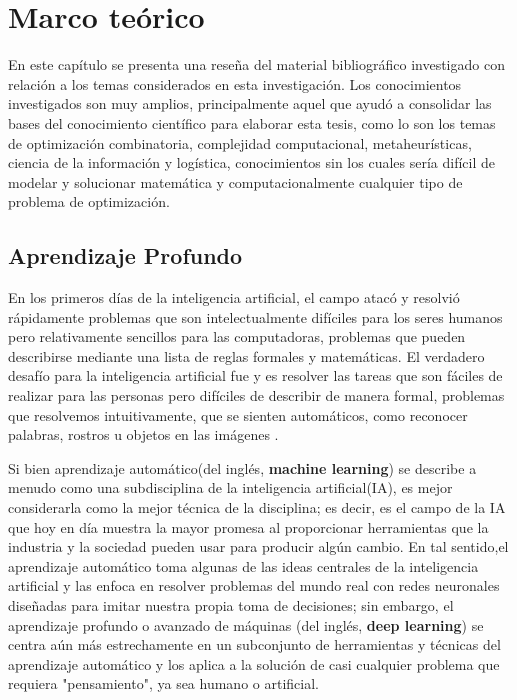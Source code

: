 \chapter{Marco teórico}
\setcounter{page}{15}
\renewcommand{\baselinestretch}{1.2} %

En este capítulo se presenta una reseña del material bibliográfico investigado con relación a los temas considerados en esta investigación. Los conocimientos investigados son muy amplios, principalmente aquel que ayudó a consolidar las bases del conocimiento científico para elaborar esta tesis, como lo son los temas de optimización combinatoria, complejidad computacional, metaheurísticas, ciencia de la información y logística, conocimientos sin los cuales sería difícil de modelar y solucionar matemática y computacionalmente cualquier tipo de problema de optimización.

\section{Aprendizaje Profundo} 
	En los primeros días de la inteligencia artificial, el campo atacó y resolvió rápidamente problemas que son intelectualmente difíciles para los seres humanos pero relativamente sencillos para las computadoras, problemas que pueden describirse mediante una lista de reglas formales y matemáticas. El verdadero desafío para la inteligencia artificial fue y es resolver las tareas que son fáciles de realizar para las personas pero difíciles de describir de manera formal, problemas que resolvemos intuitivamente, que se sienten automáticos, como reconocer palabras, rostros u objetos en las imágenes \citep{Goodfellow-et-al-2016}.

	\vskip 0.4cm  
	Si bien aprendizaje automático(del inglés, {\bf machine learning}) se describe a menudo como una subdisciplina de la inteligencia artificial(IA), es mejor considerarla como la mejor técnica de la disciplina; es decir, es el campo de la IA que hoy en día muestra la mayor promesa al proporcionar herramientas que la industria y la sociedad pueden usar para producir algún cambio. En tal sentido,el aprendizaje automático toma algunas de las ideas centrales de la inteligencia artificial y las enfoca en resolver problemas del mundo real con redes neuronales diseñadas para imitar nuestra propia toma de decisiones; sin embargo, el aprendizaje profundo o avanzado de máquinas (del inglés, {\bf deep learning}) se centra aún más estrechamente en un subconjunto de herramientas y técnicas del aprendizaje automático y los aplica a la solución de casi cualquier problema que requiera "pensamiento", ya sea humano o artificial.

